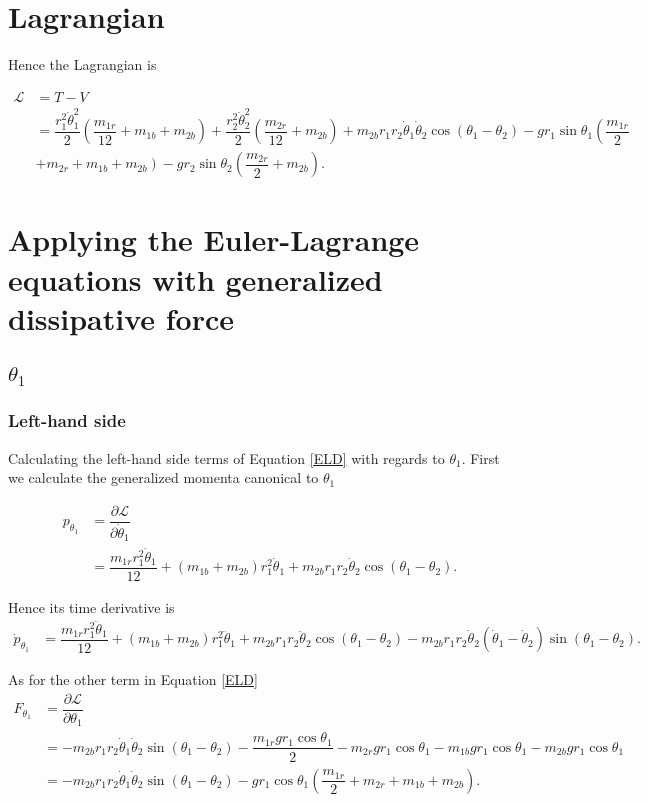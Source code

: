 \documentclass[12pt,a4paper,portrait]{article}
\newcommand{\lag}{\mathcal{L}}
\begin{document}
	\section{Lagrangian}
	Hence the Lagrangian is
	
	\begin{align*}
		\lag &= T - V \\
		&= \dfrac{r_1^2 \dot{\theta}_1^2}{2} \left(\dfrac{m_{1r}}{12} + m_{1b} + m_{2b}\right) + \dfrac{r_2^2 \dot{\theta}_2^2}{2} \left(\dfrac{m_{2r}}{12} + m_{2b}\right) + m_{2b}r_1 r_2 \dot{\theta}_1 \dot{\theta}_2 \cos{(\theta_1-\theta_2)} - gr_1 \sin{\theta_1}\left(\dfrac{m_{1r}}{2} \right.\\
		&\left.+ m_{2r} + m_{1b} + m_{2b}\right) - gr_2 \sin{\theta_2}\left(\dfrac{m_{2r}}{2} + m_{2b}\right).
	\end{align*}
	
	\section{Applying the Euler-Lagrange equations with generalized dissipative force}
	\subsection{$\theta_1$}
	\subsubsection{Left-hand side}
	Calculating the left-hand side terms of Equation \eqref{ELD} with regards to $\theta_1$. First we calculate the generalized momenta canonical to $\theta_1$
	
	\begin{align*}
		p_{\theta_1} &= \dfrac{\partial \lag}{\partial \dot{\theta}_1} \\
		&= \dfrac{m_{1r}r_1^2 \dot{\theta}_1}{12} + (m_{1b}+m_{2b}) r_1^2 \dot{\theta}_1 + m_{2b}r_1 r_2 \dot{\theta}_2 \cos{\left(\theta_1-\theta_2\right)}.
	\end{align*}
	
	Hence its time derivative is
	\begin{align*}
		\dot{p}_{\theta_1} &= \dfrac{m_{1r} r_1^2 \ddot{\theta}_1}{12} + (m_{1b}+m_{2b})r_1^2 \ddot{\theta}_1 + m_{2b}r_1 r_2 \ddot{\theta}_2\cos{(\theta_1-\theta_2)} - m_{2b}r_1 r_2 \dot{\theta}_2\left(\dot{\theta}_1 - \dot{\theta}_2\right)\sin{(\theta_1-\theta_2)}.
	\end{align*}
	
	As for the other term in Equation \eqref{ELD}
	\begin{align*}		
		F_{\theta_1} &= \dfrac{\partial \lag}{\partial \theta_1} \\
		&= -m_{2b}r_1r_2\dot{\theta}_1\dot{\theta}_2 \sin{(\theta_1-\theta_2)} - \dfrac{m_{1r}gr_1 \cos{\theta_1}}{2} -m_{2r}gr_1 \cos{\theta_1} -m_{1b}gr_1 \cos{\theta_1} -m_{2b}gr_1 \cos{\theta_1} \\
		&= -m_{2b}r_1r_2\dot{\theta}_1\dot{\theta}_2 \sin{(\theta_1-\theta_2)} -gr_1\cos{\theta_1}\left(\dfrac{m_{1r}}{2}+m_{2r}+m_{1b} + m_{2b}\right).
	\end{align*}
	
\end{document}
